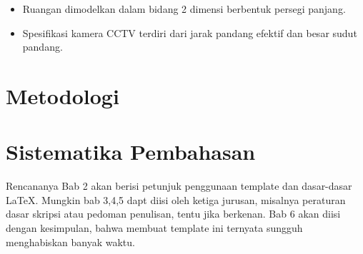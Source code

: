 \begin{itemize}
	\item Ruangan dimodelkan dalam bidang 2 dimensi berbentuk persegi panjang.
	\item Spesifikasi kamera CCTV terdiri dari jarak pandang efektif dan besar sudut pandang.
\end{itemize}

\section{Metodologi}
\label{sec:metlit}

\section{Sistematika Pembahasan}
\label{sec:sispem}
Rencananya Bab 2 akan berisi petunjuk penggunaan template dan dasar-dasar \LaTeX.
Mungkin bab 3,4,5 dapt diisi oleh ketiga jurusan, misalnya peraturan dasar skripsi atau pedoman penulisan, tentu jika berkenan.
Bab 6 akan diisi dengan kesimpulan, bahwa membuat template ini ternyata sungguh menghabiskan banyak waktu.

